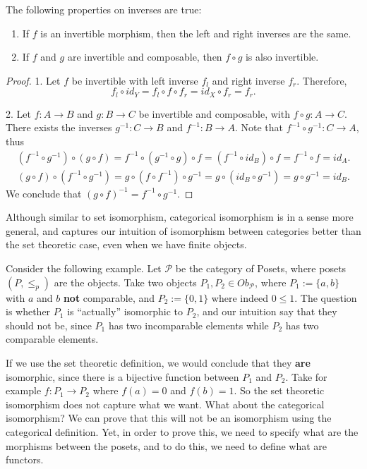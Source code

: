 \begin{proposition}
  The following properties on inverses are true:
  \begin{enumerate}[1.]
    \item If $f$ is an invertible morphism, then the left and right inverses are the same.
    \item If $f$ and $g$ are invertible and composable, then $f \circ g$ is also invertible.
  \end{enumerate}
\end{proposition}
\begin{proof}
1. Let $f$ be invertible with left inverse $f_l$ and right inverse $f_r$. Therefore,
\begin{displaymath}
  f_l \circ id_Y = f_l \circ f \circ f_r = id_X \circ f_r = f_r.
\end{displaymath}

2. Let $f:A\to B$ and $g: B \to C$ be invertible and composable, with $f\circ g: A \to C$.
There exists the inverses $g^{-1}: C \to B$ and $f^{-1}:B \to A$. Note that
$f^{-1}\circ g^{-1}:C \to A$, thus
\begin{align*}
  (f^{-1} \circ g^{-1}) \circ (g \circ f) =
  f^{-1} \circ (g^{-1} \circ g) \circ f =
  (f^{-1} \circ id_B) \circ f =
  f^{-1} \circ f =
  id_A.
\end{align*}
\begin{align*}
  (g \circ f) \circ (f^{-1} \circ g^{-1})  =
  g \circ (f \circ f^{-1}) \circ g^{-1} =
  g \circ (id_B \circ g^{-1}) =
  g \circ g^{-1} =
  id_B.
\end{align*}
We conclude that $(g\circ f)^{-1} = f^{-1} \circ g^{-1}$.
  
\end{proof}
Although similar to set isomorphism, categorical isomorphism is in a sense more general,
and captures our intuition of isomorphism between categories better than the set theoretic case,
even when we have finite objects.

Consider the following example.
Let $\mathcal P$ be the category of Posets, where posets $(P,\leq_p)$ are the objects.
Take two objects $P_1, P_2 \in Ob_\mathcal P$,
where $P_1:=\{a,b\}$ with $a$ and $b$ \textbf{not} comparable,
and $P_2:=\{0,1\}$ where indeed $0 \leq 1$. The question is whether $P_1$ is ``actually'' isomorphic
to $P_2$, and our intuition say that they should not be, since 
$P_1$ has two incomparable elements while $P_2$ has two comparable elements.

If we use the set theoretic definition, we would conclude that they \textbf{are} isomorphic,
since there is a bijective function between $P_1$ and $P_2$. 
Take for example $f:P_1\to P_2$ where $f(a)=0$ and $f(b)=1$.
So the set theoretic isomorphism does not capture what we want. What about the categorical isomorphism?
We can prove that this will not be an isomorphism using the categorical definition. Yet,
in order to prove this, we need to specify what are the morphisms between the posets,
and to do this, we need to define what are functors.

